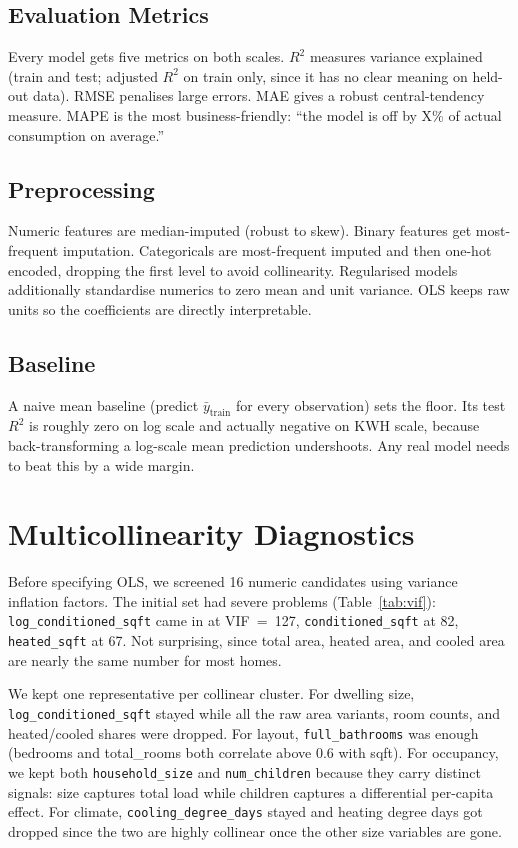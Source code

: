 \documentclass[10pt,twocolumn]{article}
\begin{document}
\subsection{Evaluation Metrics}

Every model gets five metrics on both scales. $R^2$ measures variance explained (train and test; adjusted $R^2$ on train only, since it has no clear meaning on held-out data). RMSE penalises large errors. MAE gives a robust central-tendency measure. MAPE is the most business-friendly: ``the model is off by X\% of actual consumption on average.''

\subsection{Preprocessing}

Numeric features are median-imputed (robust to skew). Binary features get most-frequent imputation. Categoricals are most-frequent imputed and then one-hot encoded, dropping the first level to avoid collinearity. Regularised models additionally standardise numerics to zero mean and unit variance. OLS keeps raw units so the coefficients are directly interpretable.

\subsection{Baseline}

A naive mean baseline (predict $\bar{y}_{\text{train}}$ for every observation) sets the floor. Its test $R^2$ is roughly zero on log scale and actually negative on KWH scale, because back-transforming a log-scale mean prediction undershoots. Any real model needs to beat this by a wide margin.

\section{Multicollinearity Diagnostics}

Before specifying OLS, we screened 16 numeric candidates using variance inflation factors. The initial set had severe problems (Table~\ref{tab:vif}): \texttt{log\_conditioned\_sqft} came in at VIF~=~127, \texttt{conditioned\_sqft} at 82, \texttt{heated\_sqft} at 67. Not surprising, since total area, heated area, and cooled area are nearly the same number for most homes.

We kept one representative per collinear cluster. For dwelling size, \texttt{log\_conditioned\_sqft} stayed while all the raw area variants, room counts, and heated/cooled shares were dropped. For layout, \texttt{full\_bathrooms} was enough (bedrooms and total\_rooms both correlate above 0.6 with sqft). For occupancy, we kept both \texttt{household\_size} and \texttt{num\_children} because they carry distinct signals: size captures total load while children captures a differential per-capita effect. For climate, \texttt{cooling\_degree\_days} stayed and heating degree days got dropped since the two are highly collinear once the other size variables are gone.
\end{document}
